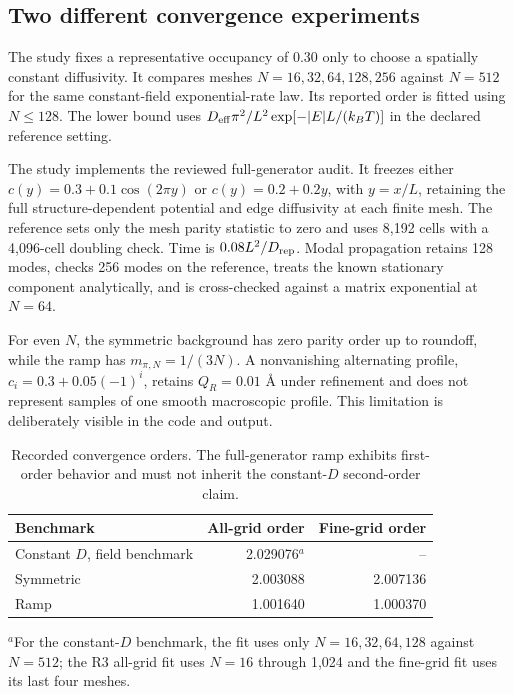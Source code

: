\documentclass[11pt,a4paper]{article}
\newcommand{\code}[1]{\texttt{\detokenize{#1}}}
\begin{document}
\subsection{Two different convergence experiments}

The \code{continuum} study fixes a representative occupancy of 0.30 only to choose a spatially constant diffusivity. It compares meshes $N=16,32,64,128,256$ against $N=512$ for the same constant-field exponential-rate law. Its reported order is fitted using $N\leq128$. The lower bound uses $D_{\rm eff}\pi^2/L^2\exp[-|E|L/(k_BT)]$ in the declared reference setting.

The \code{refinement} study implements the reviewed full-generator audit. It freezes either $c(y)=0.3+0.1\cos(2\pi y)$ or $c(y)=0.2+0.2y$, with $y=x/L$, retaining the full structure-dependent potential and edge diffusivity at each finite mesh. The reference sets only the mesh parity statistic to zero and uses 8,192 cells with a 4,096-cell doubling check. Time is $0.08L^2/D_{\rm rep}$. Modal propagation retains 128 modes, checks 256 modes on the reference, treats the known stationary component analytically, and is cross-checked against a matrix exponential at $N=64$.

For even $N$, the symmetric background has zero parity order up to roundoff, while the ramp has $m_{\pi,N}=1/(3N)$. A nonvanishing alternating profile, $c_i=0.3+0.05(-1)^i$, retains $Q_R=0.01$ \AA{} under refinement and does not represent samples of one smooth macroscopic profile. This limitation is deliberately visible in the code and output.

\begin{table}[htbp]\centering\small
\caption{Recorded convergence orders. The full-generator ramp exhibits first-order behavior and must not inherit the constant-$D$ second-order claim.}
\label{tab:orders}
\begin{tabular}{lrr}
\toprule
Benchmark & All-grid order & Fine-grid order \\
\midrule
Constant $D$, field benchmark & 2.029076$^{a}$ & -- \\
Symmetric & 2.003088 & 2.007136 \\
Ramp & 1.001640 & 1.000370 \\
\bottomrule
\end{tabular}
\par\smallskip\footnotesize $^a$For the constant-$D$ benchmark, the fit uses only $N=16,32,64,128$ against $N=512$; the R3 all-grid fit uses $N=16$ through 1,024 and the fine-grid fit uses its last four meshes.
\end{table}
\end{document}
